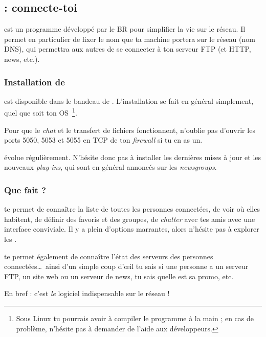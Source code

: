 
\subsection{ : connecte-toi}
\label{qrezix}

 est un programme développé par le BR pour simplifier la vie sur le réseau.
Il permet en particulier de fixer le nom que ta machine portera sur le réseau (nom DNS),
qui permettra aux autres de se connecter à ton serveur FTP (et HTTP, news, etc.).


\subsubsection{Installation de }

 est disponible dans le bandeau de \fkz. L'installation se fait en général simplement, quel que soit ton
OS~\footnote{Sous Linux tu pourrais avoir à compiler le programme à la main ;
en cas de problème, n'hésite pas à demander de l'aide aux développeurs.}.

Pour que le \emph{chat} et le transfert de fichiers fonctionnent, n'oublie pas d'ouvrir les ports 5050, 5053 et 5055 en TCP de ton \emph{firewall} si
tu en as un.

 évolue régulièrement. N'hésite donc pas à installer les dernières mises à jour et les nouveaux \emph{plug-ins}, qui sont en général
annoncés sur les \emph{newsgroups}.

\subsubsection{Que fait  ?}

 te permet de connaître la liste de toutes les personnes connectées, de voir où elles habitent, de définir des favoris et des groupes, de
\emph{chatter} avec tes amis avec une interface conviviale. Il y a plein d'options marrantes, alors n'hésite pas à explorer les .

 te permet également de connaître l'état des serveurs des personnes connectées\ldots\
ainsi d'un simple coup d'\oe il tu sais si une personne a un serveur FTP,
un site web ou un serveur de news, tu sais quelle est sa promo, etc.

En bref :  c'est \emph{le} logiciel indispensable sur le réseau !

